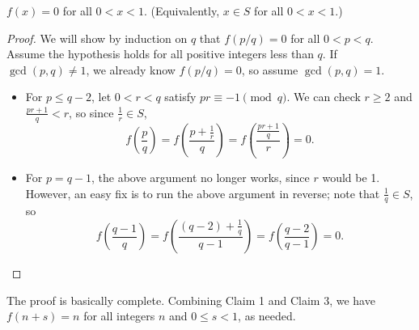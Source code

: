 \begin{claim}
    $f(x)=0$ for all $0<x<1$. (Equivalently, $x\in S$ for all $0<x<1$.)
\end{claim}
\begin{proof}
    We will show by induction on $q$ that $f(p/q)=0$ for all $0<p<q$. Assume the hypothesis holds for all positive integers less than $q$. If $\gcd(p,q)\ne1$, we already know $f(p/q)=0$, so assume $\gcd(p,q)=1$.
    \begin{itemize}
        \item For $p\le q-2$, let $0<r<q$ satisfy $pr\equiv-1\pmod q$. We can check $r\ge2$ and $\frac{pr+1}q<r$, so since $\frac1r\in S$,
            \[f\left(\frac pq\right)=f\left(\frac{p+\frac1r}q\right)=f\left(\frac{\frac{pr+1}q}r\right)=0.\]
        \item For $p=q-1$, the above argument no longer works, since $r$ would be 1. However, an easy fix is to run the above argument in reverse; note that $\frac1q\in S$, so
            \[f\left(\frac{q-1}q\right)=f\left(\frac{(q-2)+\frac1q}{q-1}\right)=f\left(\frac{q-2}{q-1}\right)=0.\]
    \end{itemize}
\end{proof}

The proof is basically complete. Combining Claim 1 and Claim 3, we have $f(n+s)=n$ for all integers $n$ and $0\le s<1$, as needed.

